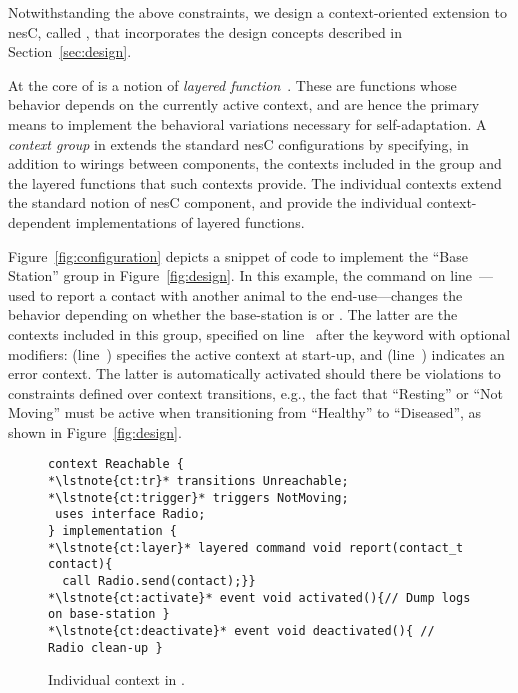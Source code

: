 \fakepar{\conesc} Notwithstanding the above constraints, we design a
context-oriented extension to nesC, called \conesc, that incorporates
the design concepts described in Section~\ref{sec:design}. 

At the core of \conesc is a notion of \emph{layered
  function}~\cite{Hirschfeld08}. These are functions whose behavior
depends on the currently active context, and are hence the primary
means to implement the behavioral variations necessary for
self-adaptation. A \emph{context group} in \conesc extends the
standard nesC configurations by specifying, in addition to wirings
between components, the contexts included in the group and the layered
functions that such contexts provide. The individual contexts extend
the standard notion of nesC component, and provide the individual
context-dependent implementations of layered functions.

Figure~\ref{fig:configuration} depicts a snippet of \conesc code to
implement the ``Base Station'' group in Figure~\ref{fig:design}. In
this example, the  command on
line~---used to report a contact with another animal
to the end-use---changes the behavior depending on whether the
base-station is  or . The latter are
the contexts included in this group, specified on line~
after the keyword  with optional modifiers:  (line~) specifies the active context at
start-up, and  (line~) indicates an
error context. The latter is automatically activated should there be
violations to constraints defined over context transitions, e.g., the
fact that ``Resting'' or ``Not Moving'' must be active when
transitioning from ``Healthy'' to ``Diseased'', as shown in
Figure~\ref{fig:design}.

\begin{figure}[!tb]
\begin{lstlisting}[style=conescframe]
context Reachable {
*\lstnote{ct:tr}* transitions Unreachable;
*\lstnote{ct:trigger}* triggers NotMoving;
 uses interface Radio;
} implementation {
*\lstnote{ct:layer}* layered command void report(contact_t contact){
  call Radio.send(contact);}}
*\lstnote{ct:activate}* event void activated(){// Dump logs on base-station }
*\lstnote{ct:deactivate}* event void deactivated(){ // Radio clean-up }
\end{lstlisting}
\vspace{-4mm}
\caption{Individual context in \conesc.}
  \label{fig:context}
\vspace{-4mm}
\end{figure}


